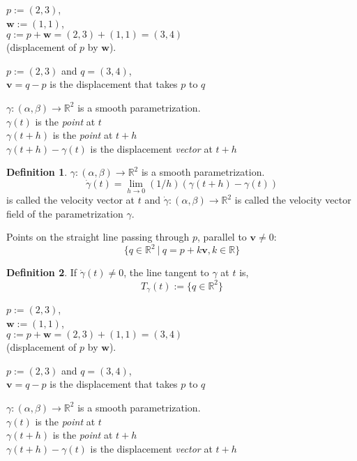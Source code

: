 \documentclass[twocolumn,20pt,fleqn]{extarticle}
\newcommand{\sep}{\vspace{0.5cm}}
\theoremstyle{plain}
\theoremstyle{definition}
\newtheorem*{definition}{Definition}
\theoremstyle{remark}
\begin{document}
\clearpage



$p := (2,3)$,\\ $\mathbf{w} := (1,1)$,\\ $q:=p + \mathbf{w} = (2,3) + (1,1) = (3,4)$ \\ (displacement of $p$ by $\mathbf{w}$).

\sep
$p := (2,3)$ and $q=(3,4)$,\\
$\mathbf{v}= q - p$ is the displacement that takes $p$ to $q$ 
\sep

$\gamma : (\alpha,\beta) \to \mathbb{R}^2$ is a smooth parametrization.\\
$\gamma(t)$ is the \emph{point} at $t$\\
$\gamma(t+h)$ is the \emph{point} at $t+h$\\
$\gamma(t+h)-\gamma(t)$ is the displacement \emph{vector} at $t+h$\\



\begin{definition}
$\gamma : (\alpha,\beta) \to \mathbb{R}^2$ is a smooth parametrization.
\[\dot{\gamma}(t) = \lim_{h\to 0} (1/h)(\gamma(t+h) - \gamma(t))\]
is called the velocity vector at $t$ and $\dot{\gamma} : (\alpha, \beta) \to \mathbb{R}^2$ is called the velocity vector field of the parametrization $\gamma$.
\end{definition}
\newpage
Points on the straight line passing through $p$, parallel to $\mathbf{v}\neq 0$:
\[\{q \in \mathbb{R}^2 \ |\ q = p  + k\mathbf{v} , k \in \mathbb{R}\}\]

\begin{definition}
  If $\dot{\gamma}(t)\neq 0$, the line tangent to $\gamma$ at $t$ is,
  \[T_\gamma(t):=\{q \in \mathbb{R}^2\}\]\end{definition}


\clearpage



$p := (2,3)$,\\ $\mathbf{w} := (1,1)$,\\ $q:=p + \mathbf{w} = (2,3) + (1,1) = (3,4)$ \\ (displacement of $p$ by $\mathbf{w}$).

\sep
$p := (2,3)$ and $q=(3,4)$,\\
$\mathbf{v}= q - p$ is the displacement that takes $p$ to $q$ 
\sep

$\gamma : (\alpha,\beta) \to \mathbb{R}^2$ is a smooth parametrization.\\
$\gamma(t)$ is the \emph{point} at $t$\\
$\gamma(t+h)$ is the \emph{point} at $t+h$\\
$\gamma(t+h)-\gamma(t)$ is the displacement \emph{vector} at $t+h$\\
\end{document}
